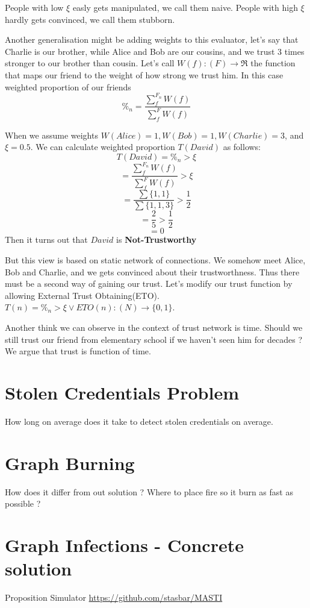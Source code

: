 \documentclass[nostrict]{szablonPG}
\begin{document}
People with low $\xi$ easly gets manipulated, we call them naive.
People with high $\xi$ hardly gets convinced, we call them stubborn. 

Another generalisation might be adding weights to this evaluator, let's say that Charlie is our brother, while Alice and Bob are our cousins, and we trust 3 times stronger to our brother than cousin. Let's call $W(f): (F) \rightarrow \Re$ the function that maps our friend to the weight of how strong we trust him. In this case weighted proportion of our friends \[\%_n = \frac{\sum\limits_f^{F_n} W(f)}{\sum\limits_f^{F} W(f)}\]

When we assume weights $W(Alice) = 1, W(Bob) = 1, W(Charlie) = 3$, and $\xi = 0.5$. We can calculate weighted proportion $T(David)$ as follows:
\[T(David) = \%_n > \xi\]
\[= \frac{\sum\limits_f^{F_n} W(f)}{\sum\limits_f^{F} W(f)} > \xi\]
\[= \frac{\sum \{1,1\}}{\sum\{1,1,3\}} > \frac{1}{2}\]
\[= \frac{2}{5} > \frac{1}{2}\]
\[= 0\]
Then it turns out that $David$ is \textbf{Not-Trustworthy}

But this view is based on static network of connections. We somehow meet Alice, Bob and Charlie, and we gets convinced about their trustworthness. Thus there must be a second way of gaining our trust. Let's modify our trust function by allowing External Trust Obtaining(ETO). $T(n) = \%_n > \xi \lor ETO(n) : (N) \rightarrow \{0,1\}$. 

Another think we can observe in the context of trust network is time. Should we still trust our friend from elementary school if we haven't seen him for decades ? We argue that trust is function of time.





\section{Stolen Credentials Problem}
How long on average does it take to detect stolen credentials on average.

\section{Graph Burning}
How does it differ from out solution ? Where to place fire so it burn as fast as possible ?


\section{Graph Infections - Concrete solution}
Proposition \cite{jekon2019content}
Simulator \url{https://github.com/stasbar/MASTI}
\end{document}
